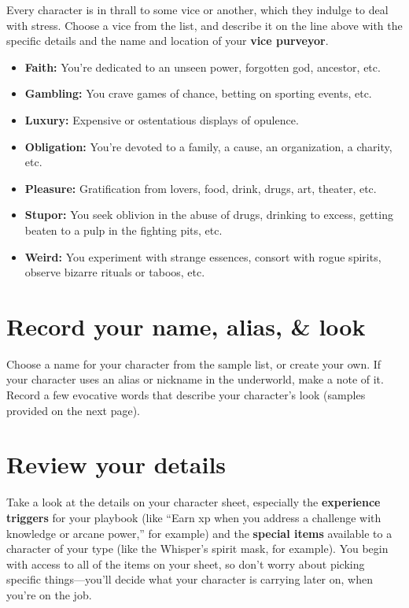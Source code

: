 \documentclass[11pt,fleqn,a5paper]{book}
\newcommand{\gameterm}[1]{\textbf{#1}}
\begin{document}
Every character is in thrall to some vice or another, which they indulge to deal with stress. Choose a vice from the list, and describe it on the line above with the specific details and the name and location of your \textbf{vice purveyor}.

\begin{itemize}
	\item \gameterm{Faith: } You’re dedicated to an unseen power, forgotten god, ancestor, etc.
	\item \gameterm{Gambling:}  You crave games of chance, betting on sporting events, etc.
	\item \gameterm{Luxury: } Expensive or ostentatious displays of opulence.
	\item \gameterm{Obligation: } You’re devoted to a family, a cause, an organization, a charity, etc.
	\item \gameterm{Pleasure:}  Gratification from lovers, food, drink, drugs, art, theater, etc.
	\item \gameterm{Stupor: } You seek oblivion in the abuse of drugs, drinking to excess, getting beaten to a pulp in the fighting pits, etc.
	\item \gameterm{Weird: } You experiment with strange essences, consort with rogue spirits, observe bizarre rituals or taboos, etc.
\end{itemize}

\section{Record your name, alias, \& look}

Choose a name for your character from the sample list, or create your own. If your character uses an alias or nickname in the underworld, make a note of it. Record a few evocative words that describe your character’s look (samples provided on the next page).

\section{Review your details}

Take a look at the details on your character sheet, especially the \textbf{experience triggers} for your playbook (like “Earn xp when you address a challenge with knowledge or arcane power,” for example) and the \textbf{special items} available to a character of your type (like the Whisper’s spirit mask, for example). You begin with access to all of the items on your sheet, so don’t worry about picking specific things---you’ll decide what your character is carrying later on, when you’re on the job.
\end{document}
